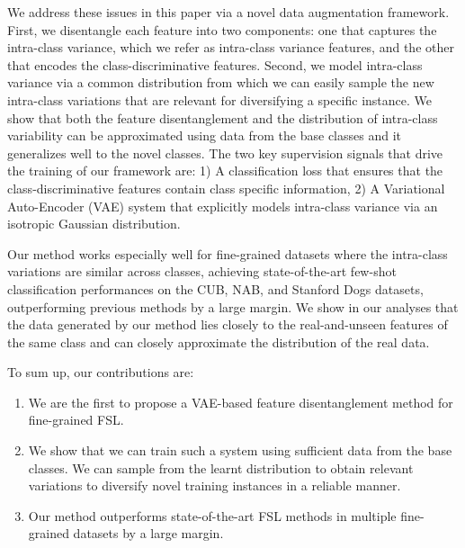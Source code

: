 \documentclass[10pt,twocolumn,letterpaper]{article}
\begin{document}
We address these issues in this paper via a novel data augmentation framework.
First, we disentangle each feature into two components: one that captures the intra-class variance, which we refer as intra-class variance features, and the other that encodes the class-discriminative features. Second, we model intra-class variance via a common distribution from which we can easily sample the new intra-class variations that are relevant for diversifying a specific instance. 
We show that both the feature disentanglement  
and the distribution of intra-class variability can be approximated using data from the base classes and it  generalizes well to the novel classes. 
The two key supervision signals that drive the training of our framework are: 1) A classification loss that ensures that the class-discriminative features contain class specific information, 2) A Variational Auto-Encoder (VAE) \cite{vae} system that explicitly models intra-class variance via an isotropic Gaussian distribution. 
















Our method works especially well for fine-grained datasets where the intra-class variations are similar across classes, achieving state-of-the-art few-shot classification performances on the CUB\cite{cub}, NAB\cite{nab}, and Stanford Dogs\cite{dog} datasets, outperforming previous methods \cite{delta-encoder,meta-opt} by a large margin. We show in our analyses that the data generated by our method lies closely to the real-and-unseen features of the same class and can closely approximate the distribution of the real data. 

To sum up, our contributions are:
\begin{enumerate}
    \item We are the first to propose a VAE-based feature disentanglement method for fine-grained FSL.
\item We show that we can train such a system using sufficient data from the base classes. We can sample from the learnt distribution to obtain relevant variations to diversify novel training instances in a reliable manner.
    \item Our method outperforms state-of-the-art FSL methods in multiple fine-grained datasets by a large margin.
\end{enumerate}
\end{document}
